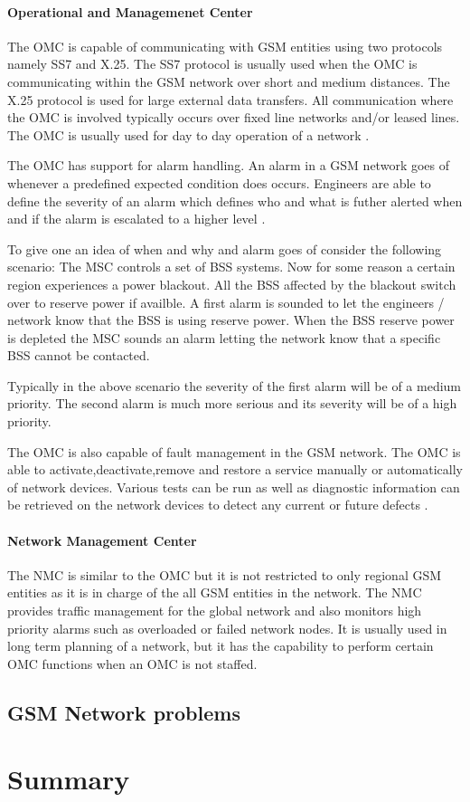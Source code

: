 \paragraph{Operational and Managemenet Center}
The OMC is capable of communicating with GSM entities using two protocols namely SS7 and X.25. The SS7 protocol is usually used when the OMC is communicating within the GSM network over short and medium distances. The X.25 protocol is used for large external data transfers. All communication where the OMC is involved typically occurs over fixed line networks and/or leased lines. The OMC is usually used for day to day operation of a network \cite{GSMSysEngin}.

The OMC has support for alarm handling. An alarm in a GSM network goes of whenever a predefined expected condition does occurs. Engineers are able to define the severity of an alarm which defines who and what is futher alerted when and if the alarm is escalated to a higher level \cite{GSMSysEngin}.

To give one an idea of when and why and alarm goes of consider the following scenario: The MSC controls a set of BSS systems. Now for some reason a certain region experiences a power blackout. All the BSS affected by the blackout switch over to reserve power if availble. A first alarm is sounded to let the engineers / network know that the BSS is using reserve power. When the BSS reserve power is depleted the MSC sounds an alarm letting the network know that a specific BSS cannot be contacted.

Typically in the above scenario the severity of the first alarm will be of a medium priority. The second alarm is much more serious and its severity will be of a high priority.

The OMC is also capable of fault management in the GSM network. The OMC is able to activate,deactivate,remove and restore a service manually or automatically of network devices. Various tests can be run as well as diagnostic information can be retrieved on the network devices to detect any current or future defects \cite{GSMSysEngin}.

\paragraph{Network Management Center}
The NMC is similar to the OMC but it is not restricted to only regional GSM entities as it is in charge of the all GSM entities in the network. The NMC provides traffic management for the global network and also monitors high priority alarms such as overloaded or failed network nodes. It is usually used in long term planning of a network, but it has the capability to perform certain OMC functions when an OMC is not staffed. 

\subsection{GSM Network problems}
\section{Summary}
